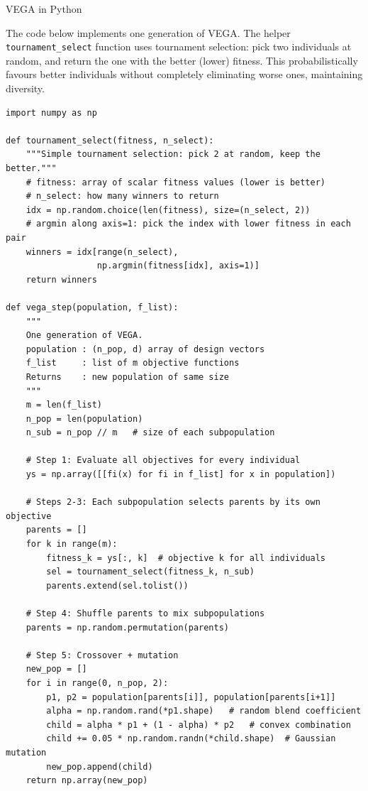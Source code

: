 \documentclass[aspectratio=169,10pt]{beamer}
\begin{document}
\begin{frame}[fragile]{VEGA in Python}

The code below implements one generation of VEGA.  The helper
\texttt{tournament\_select} function uses tournament selection: pick two
individuals at random, and return the one with the better (lower) fitness.
This probabilistically favours better individuals without completely
eliminating worse ones, maintaining diversity.

\begin{lstlisting}
import numpy as np

def tournament_select(fitness, n_select):
    """Simple tournament selection: pick 2 at random, keep the better."""
    # fitness: array of scalar fitness values (lower is better)
    # n_select: how many winners to return
    idx = np.random.choice(len(fitness), size=(n_select, 2))
    # argmin along axis=1: pick the index with lower fitness in each pair
    winners = idx[range(n_select),
                  np.argmin(fitness[idx], axis=1)]
    return winners

def vega_step(population, f_list):
    """
    One generation of VEGA.
    population : (n_pop, d) array of design vectors
    f_list     : list of m objective functions
    Returns    : new population of same size
    """
    m = len(f_list)
    n_pop = len(population)
    n_sub = n_pop // m   # size of each subpopulation

    # Step 1: Evaluate all objectives for every individual
    ys = np.array([[fi(x) for fi in f_list] for x in population])

    # Steps 2-3: Each subpopulation selects parents by its own objective
    parents = []
    for k in range(m):
        fitness_k = ys[:, k]  # objective k for all individuals
        sel = tournament_select(fitness_k, n_sub)
        parents.extend(sel.tolist())

    # Step 4: Shuffle parents to mix subpopulations
    parents = np.random.permutation(parents)

    # Step 5: Crossover + mutation
    new_pop = []
    for i in range(0, n_pop, 2):
        p1, p2 = population[parents[i]], population[parents[i+1]]
        alpha = np.random.rand(*p1.shape)   # random blend coefficient
        child = alpha * p1 + (1 - alpha) * p2   # convex combination
        child += 0.05 * np.random.randn(*child.shape)  # Gaussian mutation
        new_pop.append(child)
    return np.array(new_pop)
\end{lstlisting}

\end{frame}
\end{document}
